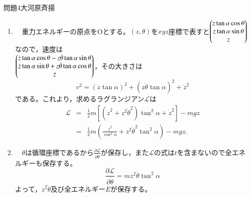 \documentclass[fleqn]{jbook}
\def\ds{\displaystyle}
\begin{document}
\begin{answer}{問題4}{大河原斉揚}
\setcounter{equation}{0}

\begin{enumerate}

  \item 　重力エネルギーの原点をOとする。$\left(z,\theta\right)$を$xyz$座標で表すと$\begin{pmatrix}z\tan\alpha \cos\theta\cr z\tan\alpha \sin\theta\cr z\end{pmatrix}$なので，速度は\\
$\begin{pmatrix}\dot{z}\tan\alpha \cos\theta -z\dot{\theta}\tan\alpha \sin\theta\cr\dot{z}\tan\alpha \sin\theta+z\dot{\theta}\tan\alpha \cos\theta\cr\dot{z}\end{pmatrix}$，その大きさは
$$v^{2}=\left(\dot{z}\tan\alpha\right)^{2}+\left(z\dot{\theta}\tan\alpha\right)^{2}+{\dot{z}}^{2}$$
である。これより，求めるラグランジアン$\mathcal L$は
\begin{eqnarray}
{\mathcal L}&=&\frac{1}{2}m\left[\left({\dot{z}}^{2}+z^{2}{\dot{\theta}}^{2}\right)\tan^{2}\alpha+{\dot{z}}^{2}\right]-mgz\\
&=&\frac{1}{2}m\left(\frac{{\dot{z}}^{2}}{\cos^{2}\alpha}+z^{2}{\dot{\theta}}^{2}\tan^{2}\alpha\right)-mgz .
\end{eqnarray}
  
  \item 　$\theta$は循環座標であるから$\ds \frac{{\partial}{\mathcal L}}{{\partial}\dot{\theta}}$が保存し，また${\mathcal L}$の式は$t$を含まないので全エネルギーも保存する。
$$\frac{{\partial}{\mathcal L}}{{\partial}\dot{\theta}}=mz^{2}\dot{\theta}\tan^{2}\alpha$$
よって，$z^{2}\dot{\theta}$及び全エネルギー$E$が保存する。\\
  

\end{enumerate}
\end{answer}
\end{document}
